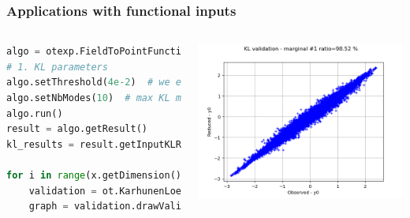 \documentclass[aspectratio=169]{beamer}
\begin{document}


\begin{frame}[containsverbatim]
\frametitle{Applications with functional inputs}


  \begin{columns}

\begin{lstlisting}[language=Python, numbers = none]
algo = otexp.FieldToPointFunctionalChaosAlgorithm(x, y)
# 1. KL parameters
algo.setThreshold(4e-2)  # we expect to explain 96% of variance
algo.setNbModes(10)  # max KL modes (default=unlimited)
algo.run()
result = algo.getResult()
kl_results = result.getInputKLResultCollection()

for i in range(x.getDimension()):
    validation = ot.KarhunenLoeveValidation(x.getMarginal(i), kl_results[i])
    graph = validation.drawValidation().getGraph(0, 0)
\end{lstlisting}


\centering
    \includegraphics[width=.9\textwidth]{figures/ValidationKL.png}
  \end{columns}

\end{frame}

\end{document}

